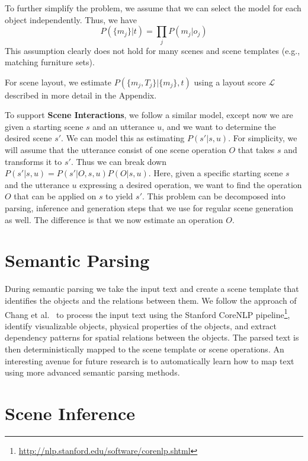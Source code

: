 \documentclass{sigchi}
\begin{document}
To further simplify the problem, we assume that we can select the model for each object independently.  Thus, we have
$$
P(\{m_j\}|t) = \prod_{j} P(m_j|o_j)
$$
This assumption clearly does not hold for many scenes and scene templates (e.g., matching furniture sets).

For scene layout, we estimate $P(\{m_j, T_j\}|\{m_j\},t)$ using a layout score $\mathcal{L}$ described in more detail in the Appendix.

To support \textbf{Scene Interactions}, we follow a similar model, except now we are given a starting scene $s$ and an utterance $u$, and we want to determine the desired scene $s'$.  We can model this as estimating $P(s'|s,u)$.  For simplicity, we will assume that the utterance consist of one scene operation $O$ that takes $s$ and transforms it to $s'$.  Thus we can break down $P(s'|s,u) = P(s'|O,s,u) P(O|s,u)$.  Here, given a specific starting scene $s$ and the utterance $u$ expressing a desired operation, we want to find the operation $O$ that can be applied on $s$ to yield $s'$.  This problem can be decomposed into parsing, inference and generation steps that we use for regular scene generation as well.  The difference is that we now estimate an operation $O$.


\section{Semantic Parsing}

During semantic parsing we take the input text and create a scene template that identifies the objects and the relations between them.  We follow the approach of Chang et al.~\cite{chang2014spatial} to process the input text using the Stanford CoreNLP pipeline\footnote{\scriptsize\url{http://nlp.stanford.edu/software/corenlp.shtml}}, identify visualizable objects, physical properties of the objects, and extract dependency patterns for spatial relations between the objects.  The parsed text is then deterministically mapped to the scene template or scene operations.  An interesting avenue for future research is to automatically learn how to map text using more advanced semantic parsing methods.

\section{Scene Inference}
\end{document}
